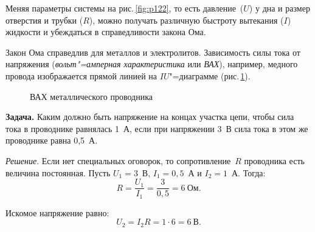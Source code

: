 \documentclass[main.tex]{subfiles}
\begin{document}
Меняя параметры системы на рис.\,\ref{fig:p122}, то есть давление~($U$) у дна и размер отверстия и трубки ($R$), можно получать различную быстроту вытекания ($I$) жидкости и убеждаться в справедливости закона Ома.


Закон Ома справедлив для металлов и электролитов. Зависимость силы тока от напряжения (\emph{вольт"=амперная характеристика} или \emph{ВАХ}), например, медного провода изображается прямой линией на $IU$"=диаграмме (рис.\,\ref{fig:p123}).  

\begin{figure}[H]
    \centering

\caption{ВАХ металлического проводника}
\label{fig:p123}
\end{figure}


\noindent\textbf{Задача.} Каким должно быть напряжение на концах участка цепи, чтобы сила тока в проводнике равнялась 1~А, если при напряжении 3~В сила тока в этом же проводнике равна 0,5~А.

\smallskip

\noindent\emph{Решение}. Если нет специальных оговорок, то сопротивление~$R$ проводника есть величина постоянная. Пусть $U_1=3$~В, $I_1=0{,}5$~А и $I_2=1$~А. Тогда:
\begin{equation*}
    R=\frac{U_1}{I_1}=\frac{3}{0{,}5}=6~\text{Ом}.
\end{equation*}

Искомое напряжение равно:
\begin{equation*}
    U_2=I_2R=1\cdot6=6~\text{В}.
\end{equation*}



 
\end{document}
